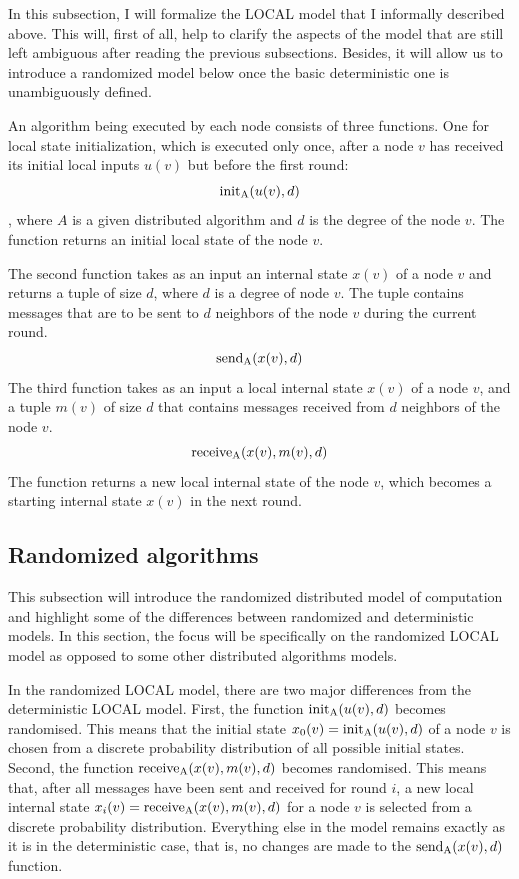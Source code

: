 In this subsection, I will formalize the LOCAL model that I informally described above.
This will, first of all, help to clarify the aspects of the model that are still left ambiguous
after reading the previous subsections. Besides, it will allow us to introduce
a randomized model below once the basic deterministic one is unambiguously defined.

An algorithm being executed by each node consists of 
three functions. One for local state initialization, which is executed only once, after
a node $v$ has received its initial local inputs $u(v)$ but before the first round:
$$\init_A(u(v), d)$$,
where $A$ is a given distributed algorithm and $d$ is the degree of the node $v$.
The function returns an initial local state of the node $v$.

The second function takes as an input an internal state $x(v)$ of a node $v$
and returns a tuple of size $d$, where $d$ is a degree of node $v$. The
tuple contains messages that are to be sent to $d$ neighbors of the node $v$
during the current round.
$$\send_A(x(v), d)$$
The third function takes as an input a local internal state $x(v)$ of a node
$v$, and a tuple $m(v)$ of size $d$ that contains messages received from $d$ neighbors
of the node $v$.
$$\receive_A(x(v), m(v), d)$$
The function returns a new local internal state of the node $v$, which becomes a
starting internal state $x(v)$ in the next round.

\subsection{Randomized algorithms}

This subsection will introduce the randomized distributed model of computation
and highlight some of the differences between randomized and deterministic
models. In this section, the focus will be specifically on the randomized LOCAL
model as opposed to some other distributed algorithms models.

In the randomized LOCAL model, there are two major differences from the
deterministic LOCAL model. First, the function $\init_A(u(v), d)$ becomes
randomised. This means that the initial state $x_0(v) = \init_A(u(v), d)$ of a node $v$ is
chosen from a discrete probability distribution of all possible initial states.
Second, the function $\receive_A(x(v), m(v), d)$ becomes randomised. This means that,
after all messages have been sent and received for round $i$, a new local internal
state $x_i(v) = \receive_A(x(v), m(v), d)$ for a node $v$ is selected from a
discrete probability distribution. Everything else in the model remains exactly
as it is in the deterministic case, that is, no changes are made to the $\send_A(x(v), d)$
function.

